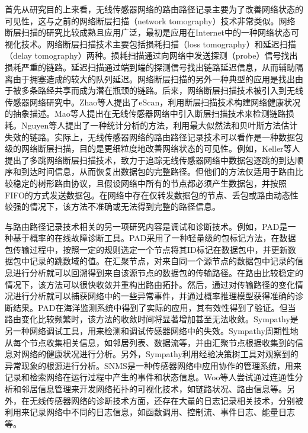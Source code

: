 首先从研究目的上来看，无线传感器网络的路由路径记录主要为了改善网络状态的可见性，这与之前的网络断层扫描（network tomography）技术非常类似。网络断层扫描的研究比较成熟且应用广泛，最初是应用在Internet中的一种网络状态可视化技术。网络断层扫描技术主要包括损耗扫描（loss tomography）和延迟扫描（delay tomography）两种。损耗扫描通过向网络中发送探测（probe）信号找出损耗严重的链路。延迟扫描通过端到端的探测信号找出链路延迟信息，从而辅助隔离由于拥塞造成的较大的队列延迟。网络断层扫描的另外一种典型的应用是找出由于被多条路经共享而成为潜在瓶颈的链路。后来，网络断层扫描技术被引入到无线传感器网络研究中。Zhao等人提出了eScan，利用断层扫描技术构建网络健康状况的抽象描述。Mao等人提出在无线传感器网络中引入断层扫描技术来检测链路损耗。Nguyen等人提出了一种统计分析的方法，利用最大似然法和贝叶斯方法估计失效的链路。实际上，无线传感器网络的路由路径记录技术可以看作是一种数据包级的网络断层扫描，目的是更细粒度地改善网络状态的可见性。例如，Keller等人提出了多跳网络断层扫描技术，致力于追踪无线传感器网络中数据包逐跳的到达顺序和到达时间信息，从而恢复出数据包的完整路径。但他们的方法仅适用于路由比较稳定的树形路由协议，且假设网络中所有的节点都必须产生数据包，并按照FIFO的方式发送数据包。在网络中存在仅转发数据包的节点、丢包或路由动态性较强的情况下，该方法不准确或无法得到完整的路径信息。

与路由路径记录技术相关的另一项研究内容是调试和诊断技术。例如，PAD是一种基于概率的在线故障诊断工具。PAD采用了一种轻量级的包标记方法，在数据包传输过程中，按照一定的规则选定一个节点将其ID标记在数据包中，并更新数据包中记录的跳数域的值。在汇聚节点，对来自同一个源节点的数据包中记录的信息进行分析就可以回溯得到来自该源节点的数据包的传输路径。在路由比较稳定的情况下，该方法可以很快收敛并重构出路由拓扑。然后，通过对传输路径的变化情况进行分析就可以捕获网络中的一些异常事件，并通过概率推理模型获得准确的诊断结果。PAD在海洋监测系统中得到了实际的应用，其有效性得到了验证。但当路由变化比较频繁时，该方法的收敛时间将显著增加甚至无法收敛。Sympathy是另一种网络调试工具，用来检测和调试传感器网络中的失效。Sympathy周期性地从每个节点收集相关信息，如邻居列表、数据流等，并由汇聚节点根据收集到的信息对网络的健康状况进行分析。另外，Sympathy利用经验决策树工具对观察到的异常现象的根源进行分析。SNMS是一种传感器网络中应用协作的管理系统，用来记录和检索网络在运行过程中产生的事件和状态信息。Woo等人尝试通过连通性分析和邻居信息管理来开发网络拓扑的可视化技术，如链路状况、路由信息等。另外，在无线传感器网络的诊断技术方面，还存在大量的日志记录相关技术，分别被利用来记录网络中不同的日志信息，如函数调用、控制流、事件日志、能量日志等。

